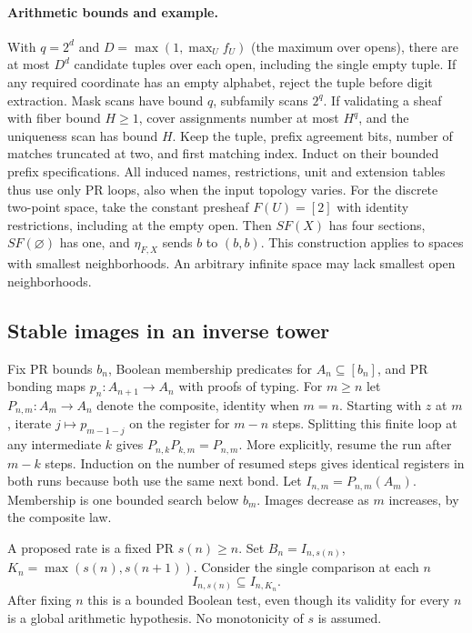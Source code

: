\paragraph{Arithmetic bounds and example.}
With $q=2^d$ and $D=\max(1,\max_U f_U)$ (the maximum over opens),
there are at most $D^d$ candidate tuples over each open, including the
single empty tuple. If any required coordinate has an empty alphabet, reject the tuple before digit extraction. Mask scans have bound $q$, subfamily
scans $2^q$. If validating a sheaf with fiber bound $H\ge1$, cover
assignments number at most $H^q$, and the uniqueness scan has bound $H$.
Keep the tuple, prefix agreement bits, number of matches truncated at two,
and first matching index. Induct on their bounded prefix specifications.
All induced names, restrictions, unit and extension tables thus use only
PR loops, also when the input topology varies. For the discrete
two-point space, take the constant presheaf $F(U)=[2]$ with identity
restrictions, including at the empty open. Then $SF(X)$ has four sections,
$SF(\varnothing)$ has one, and $\eta_{F,X}$ sends $b$ to $(b,b)$.
This construction applies to spaces with smallest neighborhoods. An arbitrary infinite space may lack
smallest open neighborhoods.

\subsection{Stable images in an inverse tower}

Fix PR bounds $b_n$, Boolean membership predicates for
$A_n\subseteq[b_n]$, and PR bonding maps
$p_n:A_{n+1}\to A_n$ with proofs of typing.
For $m\ge n$ let $P_{n,m}:A_m\to A_n$ denote the composite, identity
when $m=n$. Starting with $z$ at $m$, iterate $j\mapsto
p_{m-1-j}$ on the register for $m-n$ steps.
Splitting this finite loop at any intermediate $k$ gives
$P_{n,k}P_{k,m}=P_{n,m}$. More explicitly, resume the run after
$m-k$ steps. Induction on the number of resumed steps gives identical
registers in both runs because both use the same next bond.
Let $I_{n,m}=P_{n,m}(A_m)$. Membership is one bounded search below $b_m$.
Images decrease as $m$ increases, by the composite law.

A proposed rate is a fixed PR $s(n)\ge n$. Set $B_n=I_{n,s(n)}$,
$K_n=\max(s(n),s(n+1))$. Consider the single comparison at each $n$
\begin{equation}
       I_{n,s(n)}\subseteq I_{n,K_n}.                   \tag{C}\label{eq:catcap}
\end{equation}
After fixing $n$ this is a bounded Boolean test, even though its validity
for every $n$ is a global arithmetic hypothesis. No monotonicity of $s$
is assumed.

